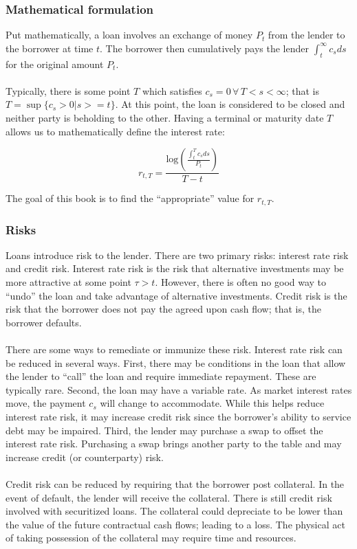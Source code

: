 \documentclass{article}
\theoremstyle{definition}
\begin{document}
\subsubsection{Mathematical formulation}
Put mathematically, a loan involves an exchange of money \(P_t\) from the lender to the borrower at time \(t\).  The borrower then cumulatively pays the lender \(\int_t ^ \infty c_s ds\) for the original amount \(P_t\).  
\\
\\
Typically, there is some point \(T\) which satisfies \(c_s=0\, \forall\, T<s<\infty\); that is \(T= \sup\{c_s>0 | s>=t\} \).  At this point, the loan is considered to be closed and neither party is beholding to the other.  Having a terminal or maturity date \(T\) allows us to mathematically define the interest rate:

\[r_{t, T}=\frac{\mathrm{log}\left(\frac{\int_t ^ T c_s ds}{P_t}\right)}{ T-t} \]

The goal of this book is to find the ``appropriate'' value for \(r_{t, T}\).

\subsubsection{Risks}
Loans introduce risk to the lender.  There are two primary risks: interest rate risk and credit risk.  Interest rate risk is the risk that alternative investments may be more attractive at some point \(\tau>t\).  However, there is often no good way to ``undo'' the loan and take advantage of alternative investments.  Credit risk is the risk that the borrower does not pay the agreed upon cash flow; that is, the borrower defaults.  
\\
\\
There are some ways to remediate or immunize these risk.  Interest rate risk can be reduced in several ways.  First, there may be conditions in the loan that allow the lender to ``call'' the loan and require immediate repayment.  These are typically rare.  Second, the loan may have a variable rate.  As market interest rates move, the payment \(c_s\) will change to accommodate.  While this helps reduce interest rate risk, it may increase credit risk since the borrower's ability to service debt may be impaired.   Third, the lender may purchase a swap to offset the interest rate risk.  Purchasing a swap brings another party to the table and may increase credit (or counterparty) risk.  
\\
\\
Credit risk can be reduced by requiring that the borrower post collateral.  In the event of default, the lender will receive the collateral.  There is still credit risk involved with securitized loans.  The collateral could depreciate to be lower than the value of the future contractual cash flows; leading to a loss.  The physical act of taking possession of the collateral may require time and resources.  
\end{document}
